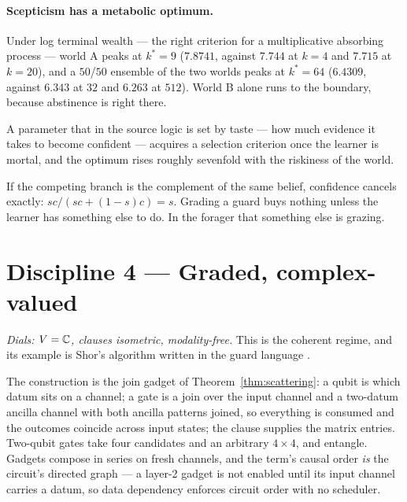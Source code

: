 \paragraph{Scepticism has a metabolic optimum.} Under log terminal wealth --- the
right criterion for a multiplicative absorbing process --- world A peaks at
$k^{*} = 9$ ($7.8741$, against $7.744$ at $k=4$ and $7.715$ at $k=20$), and a
$50$/$50$ ensemble of the two worlds peaks at $k^{*} = 64$ ($6.4309$, against
$6.343$ at $32$ and $6.263$ at $512$). World B alone runs to the boundary, because
abstinence is right there.

\begin{principle}
\label{prin:scept}
A parameter that in the source logic is set by taste --- how much evidence it
takes to become confident --- acquires a selection criterion once the learner is
mortal, and the optimum rises roughly sevenfold with the riskiness of the world.
\end{principle}

\begin{remark}
If the competing branch is the complement of the same belief, confidence cancels
exactly: $sc / (sc + (1-s)c) = s$. Grading a guard buys nothing unless the learner
has something else to do. In the forager that something else is grazing.
\end{remark}

\section{Discipline 4 --- Graded, complex-valued}
\label{sec:d4}

\emph{Dials: $V = \mathbb{C}$, clauses isometric, modality-free.} This is the coherent
regime, and its example is Shor's algorithm written in the guard language
\cite{GradedWhere}.

The construction is the join gadget of Theorem~\ref{thm:scattering}: a qubit is
which datum sits on a channel; a gate is a join over the input channel and a
two-datum ancilla channel with both ancilla patterns joined, so everything is
consumed and the outcomes coincide across input states; the clause supplies the
matrix entries. Two-qubit gates take four candidates and an arbitrary $4\times4$,
and entangle. Gadgets compose in series on fresh channels, and the term's causal
order \emph{is} the circuit's directed graph --- a layer-2 gadget is not enabled
until its input channel carries a datum, so data dependency enforces circuit order
with no scheduler.

